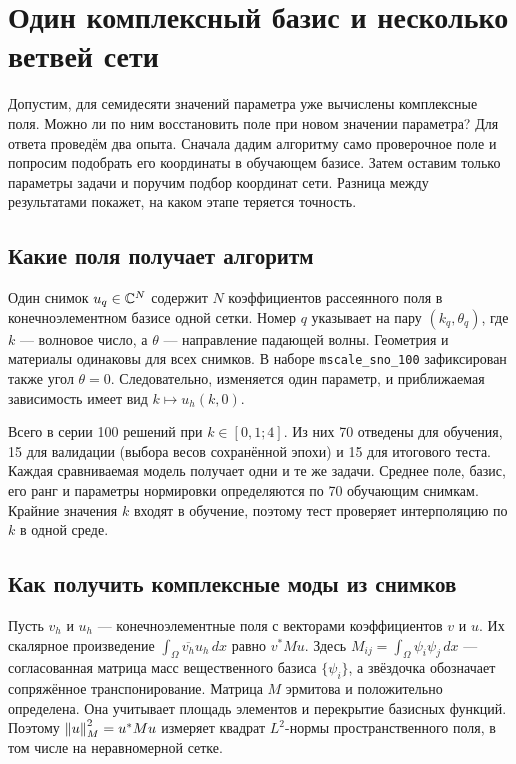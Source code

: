 \chapter{Один комплексный базис и несколько ветвей сети}
\label{adv:chapter}

Допустим, для семидесяти значений параметра уже вычислены комплексные поля.
Можно ли по ним восстановить поле при новом значении параметра?
Для ответа проведём два опыта. Сначала дадим алгоритму само проверочное
поле и попросим подобрать его координаты в обучающем базисе. Затем оставим
только параметры задачи и поручим подбор координат сети. Разница между
результатами покажет, на каком этапе теряется точность.

\section{Какие поля получает алгоритм}
\label{adv:family}

Один снимок $u_q\in\mathbb{C}^N$ содержит $N$ коэффициентов рассеянного поля
в конечноэлементном базисе одной сетки. Номер $q$ указывает на пару
$(k_q,\theta_q)$, где $k$ --- волновое число, а $\theta$ --- направление
падающей волны. Геометрия и материалы одинаковы для всех снимков.
В наборе \texttt{mscale\_sno\_100} зафиксирован также угол
$\theta=0$. Следовательно, изменяется один параметр, и приближаемая
зависимость имеет вид $k\mapsto u_h(k,0)$.

Всего в серии 100 решений при $k\in[0{,}1;4]$. Из них 70 отведены для
обучения, 15 для валидации (выбора весов сохранённой эпохи) и 15 для
итогового теста. Каждая сравниваемая модель получает одни и те же задачи.
Среднее поле, базис, его ранг и параметры нормировки определяются по 70
обучающим снимкам. Крайние значения $k$ входят в обучение, поэтому тест
проверяет интерполяцию по $k$ в одной среде.

\section{Как получить комплексные моды из снимков}
\label{adv:pod}

Пусть $v_h$ и $u_h$ --- конечноэлементные поля с векторами коэффициентов
$v$ и $u$. Их скалярное произведение $\int_\Omega\overline{v_h}u_h\,dx$
равно $v^*Mu$. Здесь $M_{ij}=\int_\Omega\psi_i\psi_j\,dx$ ---
согласованная матрица масс вещественного базиса $\{\psi_i\}$,
а звёздочка обозначает сопряжённое транспонирование. Матрица $M$
эрмитова и положительно определена. Она учитывает площадь элементов
и перекрытие базисных функций. Поэтому $\left\lVert u\right\rVert_M^2=u^*Mu$
измеряет квадрат $L^2$-нормы пространственного поля, в том числе на
неравномерной сетке.

